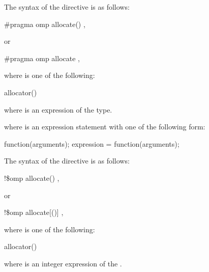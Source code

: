 \syntax
\begin{ccppspecific}
The syntax of the  directive is as follows:

\begin{boxedcode}
\#pragma omp allocate() \plc{[clause[ [ [},\plc{] clause] ... ]] new-line}
\end{boxedcode}

or

\begin{boxedcode}
\#pragma omp allocate \plc{[clause[ [ [},\plc{] clause] ... ]] new-line}
\end{boxedcode}

where  is one of the following:

\begin{indentedcodelist}
allocator()
\end{indentedcodelist}

where  is an expression of the  type.

where  is an expression statement with one of the following form:
\begin{codepar}
    function(arguments);
    expression = function(arguments);
\end{codepar}

\end{ccppspecific}
\medskip

\begin{fortranspecific}
The syntax of the  directive is as follows:

\begin{boxedcode}
!\$omp allocate() \plc{[clause[ [ [},\plc{] clause] ... ]]}
\end{boxedcode}

or
\begin{boxedcode}
!\$omp allocate[()] \plc{clause[ [ [},\plc{] clause] ... ]}
\end{boxedcode}

where  is one of the following:

\begin{indentedcodelist}
allocator()
\end{indentedcodelist}

where  is an integer expression of the  .

\end{fortranspecific}

